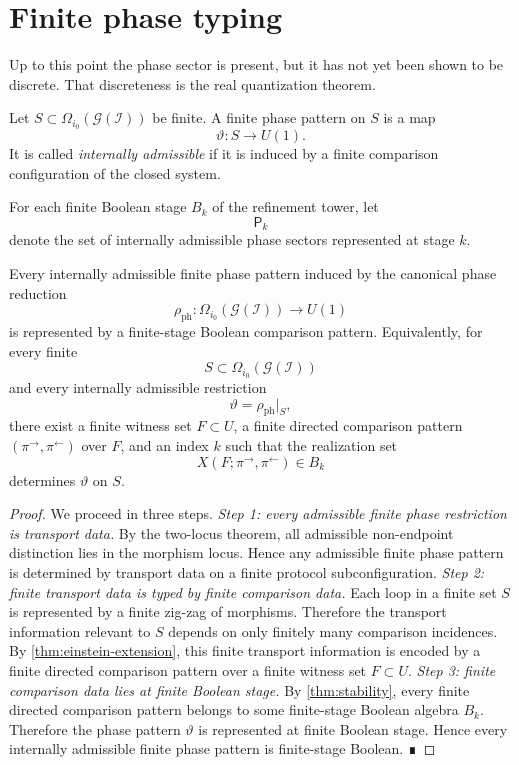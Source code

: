 \section{Finite phase typing}
\label{sec:em-finite-phase-typing}
Up to this point the phase sector is present, but it has not yet been
shown to be discrete.
That discreteness is the real quantization theorem.
\begin{definition}
	Let \(S\subset \Omega_{i_0}(\mathcal G(\mathcal I))\) be finite.
	A finite phase pattern on \(S\) is a map
	\[
		\vartheta:S\to U(1).
	\]
	It is called \emph{internally admissible} if it is induced by a finite
	comparison configuration of the closed system.
\end{definition}
\begin{definition}
	For each finite Boolean stage \(B_k\) of the refinement tower, let
	\[
		\mathsf P_k
	\]
	denote the set of internally admissible phase sectors represented at
	stage \(k\).
\end{definition}
\begin{theorem}
	\label{thm:em-finite-phase-typing}
	Every internally admissible finite phase pattern induced by the
	canonical phase reduction
	\[
		\rho_{\mathrm{ph}}:\Omega_{i_0}(\mathcal G(\mathcal I))\to U(1)
	\]
	is represented by a finite-stage Boolean comparison pattern.
	Equivalently, for every finite
	\[
		S\subset \Omega_{i_0}(\mathcal G(\mathcal I))
	\]
	and every internally admissible restriction
	\[
		\vartheta=\rho_{\mathrm{ph}}|_S,
	\]
	there exist a finite witness set \(F\subset U\), a finite directed
	comparison pattern \((\pi^\rightarrow,\pi^\leftarrow)\) over \(F\), and
	an index \(k\) such that the realization set
	\[
		X(F;\pi^\rightarrow,\pi^\leftarrow)\in B_k
	\]
	determines \(\vartheta\) on \(S\).
\end{theorem}
\begin{proof}
	We proceed in three steps.
	\smallskip
	\noindent\emph{Step 1: every admissible finite phase restriction is
		transport data.}
	By the two-locus theorem, all admissible non-endpoint distinction lies
	in the morphism locus.
	Hence any admissible finite phase pattern is determined by transport
	data on a finite protocol subconfiguration.
	\smallskip
	\noindent\emph{Step 2: finite transport data is typed by finite
		comparison data.}
	Each loop in a finite set \(S\) is represented by a finite zig-zag of
	morphisms.
	Therefore the transport information relevant to \(S\) depends on only
	finitely many comparison incidences.
	By \cref{thm:einstein-extension}, this finite transport
	information is encoded by a finite directed comparison pattern over a
	finite witness set \(F\subset U\).
	\smallskip
	\noindent\emph{Step 3: finite comparison data lies at finite Boolean
		stage.}
	By \cref{thm:stability}, every finite
	directed comparison pattern belongs to some finite-stage Boolean
	algebra \(B_k\).
	Therefore the phase pattern \(\vartheta\) is represented at finite
	Boolean stage.
	Hence every internally admissible finite phase pattern is finite-stage
	Boolean. ∎
\end{proof}
